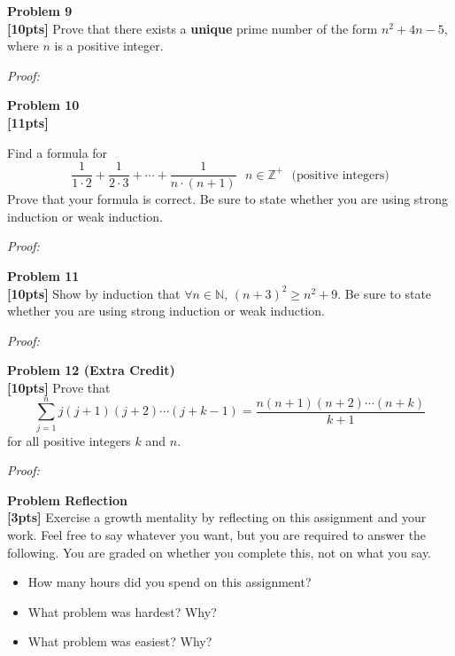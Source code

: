 \documentclass{article}
\newenvironment{problem}[2][Problem]
    { \begin{mdframed}[backgroundcolor=gray!20] \textbf{#1 #2} \\}
    {  \end{mdframed}}
\newenvironment{solution}
    {\textit{Proof:}}
    {}
\begin{document}
\begin{problem}{9}
\textbf{[10pts]} Prove that there exists a \textbf{unique} prime number of the form $n^2 + 4n - 5$, where $n$ is a positive integer.
\end{problem}

\begin{solution}
\end{solution}


\begin{problem}{10}
\textbf{[11pts]} \item Find a formula for
$$ \frac{1}{1\cdot 2} + \frac{1}{2\cdot 3} + \cdots + \frac{1}{n\cdot (n+1)}\ \ \ n\in\mathbb{Z}^+\ \ \ \text{(positive integers)}$$
Prove that your formula is correct. Be sure to state whether you are using strong induction or weak induction.
\end{problem}

\begin{solution}
\end{solution}

\begin{problem}{11}
\textbf{[10pts]} Show by induction that $\forall n\in\mathbb{N}$, $(n+3)^2\geq n^2+9$. Be sure to state whether you are using strong induction or weak induction.
\end{problem}

\begin{solution}
\end{solution}

\begin{problem}{12 (Extra Credit)}
\textbf{[10pts]} Prove that $$\sum_{j=1}^n j(j+1)(j+2)\cdots(j+k-1)=\frac{n(n+1)(n+2)\cdots(n+k)}{k+1}$$ for all positive integers $k$ and $n$.
\end{problem}

\begin{solution}
\end{solution}

\begin{problem}{Reflection}
\textbf{[3pts]} Exercise a growth mentality by reflecting on this assignment and your work. Feel free to say whatever you want, but you are required to answer the following. You are graded on whether you complete this, not on what you say.
\begin{itemize}
\item How many hours did you spend on this assignment?
\item What problem was hardest? Why?
\item What problem was easiest? Why?
\end{itemize}
\end{problem}
\end{document}
